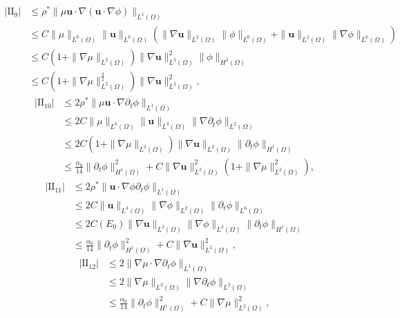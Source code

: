 \documentclass[11pt]{article}
\numberwithin{equation}{section}
\begin{document}
\begin{equation}\label{4.33}
\begin{split}
|\text{II}_9|&\leq \rho^*\|\mu\mathbf{u}\cdot\nabla(\mathbf{u}\cdot\nabla\phi)\|_{L^1(\Omega)} \\
&\leq C\|\mu\|_{L^6(\Omega)}\|\mathbf{u}\|_{L^6(\Omega)}(\|\nabla\mathbf{u}\|_{L^2(\Omega)}
\|\phi\|_{L^6(\Omega)}+\|\mathbf{u}\|_{L^2(\Omega)}
\|\nabla\phi\|_{L^6(\Omega)}) \\
&\leq C(1+\|\nabla\mu\|_{L^2(\Omega)})\|\nabla\mathbf{u}\|_{L^2(\Omega)}^2
\|\phi\|_{H^2(\Omega)} \\
&\leq C(1+\|\nabla\mu\|_{L^2(\Omega)}^{\frac{3}{2}}) \|\nabla\mathbf{u}\|_{L^2(\Omega)}^2 ,
\end{split}
\end{equation}
\begin{equation}\label{4.34}
\begin{split}
|\text{II}_{10}|&\leq 2\rho^*\|\mu\mathbf{u}\cdot\nabla\partial_t\phi\|_{L^1(\Omega)} \\
&\leq 2C\|\mu\|_{L^6(\Omega)}\|\mathbf{u}\|_{L^3(\Omega)}
\|\nabla\partial_t\phi\|_{L^2(\Omega)} \\
&\leq 2C(1+\|\nabla\mu\|_{L^2(\Omega)})\|\nabla\mathbf{u}\|_{L^2(\Omega)}
\|\partial_t\phi\|_{H^1(\Omega)}\\
&\leq \frac{\alpha_0}{14}\|\partial_t\phi\|_{H^1(\Omega)}^2 + C\|\nabla\mathbf{u}\|_{L^2(\Omega)}^2(1+\|\nabla\mu\|_{L^2(\Omega)}^2) ,
\end{split}
\end{equation}
\begin{equation}\label{4.35}
\begin{split}
|\text{II}_{11}|&\leq 2\rho^*\|\mathbf{u}\cdot\nabla\phi\partial_t\phi\|_{L^1(\Omega)} \\
&\leq 2C\|\mathbf{u}\|_{L^3(\Omega)}\|\nabla\phi\|_{L^2(\Omega)}
\|\partial_t\phi\|_{L^6(\Omega)} \\
&\leq 2C(E_0)\|\nabla\mathbf{u}\|_{L^2(\Omega)}
\|\nabla\phi\|_{L^2(\Omega)}
\|\partial_t\phi\|_{H^1(\Omega)} \\
&\leq \frac{\alpha_0}{14}\|\partial_t\phi\|_{H^1(\Omega)}^2 + C\|\nabla\mathbf{u}\|_{L^2(\Omega)}^2,
\end{split}
\end{equation}
\begin{equation}\label{4.36}
\begin{split}
|\text{II}_{12}|&\leq 2\|\nabla\mu\cdot\nabla\partial_t\phi\|_{L^1(\Omega)} \\
&\leq 2\|\nabla\mu\|_{L^2(\Omega)}\|\nabla\partial_t\phi\|_{L^2(\Omega)} \\
&\leq \frac{\alpha_0}{14}\|\partial_t\phi\|_{H^1(\Omega)}^2 + C\|\nabla\mu\|_{L^2(\Omega)}^2 ,
\end{split}
\end{equation}
\end{document}

